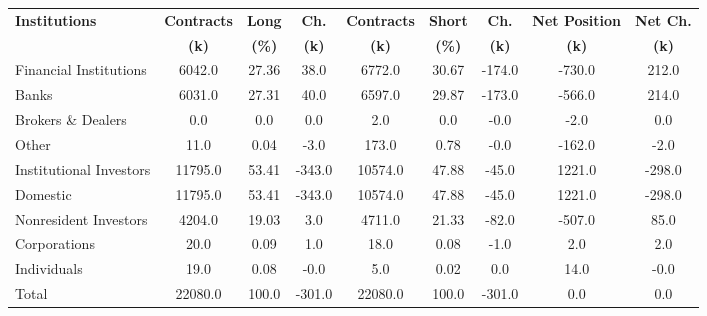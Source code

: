 \documentclass[article,crop=false]{standalone}%
\begin{document}
%
\normalsize%
\setlength{\tabcolsep}{0.15cm}%
\begin{tabular}[h]{l | c c c | c c c | c c}%
\hline%
\rowcolor{white}%
\textbf{Institutions}&\textbf{Contracts}&\textbf{Long}&\textbf{Ch.}&\textbf{Contracts}&\textbf{Short}&\textbf{Ch.}&\textbf{Net Position}&\textbf{Net Ch.}\\%
\rowcolor{white}%
\textbf{}&\textbf{(k)}&\textbf{(\%)}&\textbf{(k)}&\textbf{(k)}&\textbf{(\%)}&\textbf{(k)}&\textbf{(k)}&\textbf{(k)}\\%
\hline%
\rowcolor{lightgray}%
Financial Institutions&6042.0&27.36&38.0&6772.0&30.67&{-}174.0&{-}730.0&212.0\\%
\rowcolor{white}%
Banks&6031.0&27.31&40.0&6597.0&29.87&{-}173.0&{-}566.0&214.0\\%
\rowcolor{lightgray}%
Brokers \& Dealers&0.0&0.0&0.0&2.0&0.0&{-}0.0&{-}2.0&0.0\\%
\rowcolor{white}%
Other&11.0&0.04&{-}3.0&173.0&0.78&{-}0.0&{-}162.0&{-}2.0\\%
\rowcolor{lightgray}%
Institutional Investors&11795.0&53.41&{-}343.0&10574.0&47.88&{-}45.0&1221.0&{-}298.0\\%
\rowcolor{white}%
Domestic&11795.0&53.41&{-}343.0&10574.0&47.88&{-}45.0&1221.0&{-}298.0\\%
\rowcolor{lightgray}%
Nonresident Investors&4204.0&19.03&3.0&4711.0&21.33&{-}82.0&{-}507.0&85.0\\%
\rowcolor{white}%
Corporations&20.0&0.09&1.0&18.0&0.08&{-}1.0&2.0&2.0\\%
\rowcolor{lightgray}%
Individuals&19.0&0.08&{-}0.0&5.0&0.02&0.0&14.0&{-}0.0\\%
\rowcolor{white}%
Total&22080.0&100.0&{-}301.0&22080.0&100.0&{-}301.0&0.0&0.0\\%
\hline%
\end{tabular}%
\end{document}
